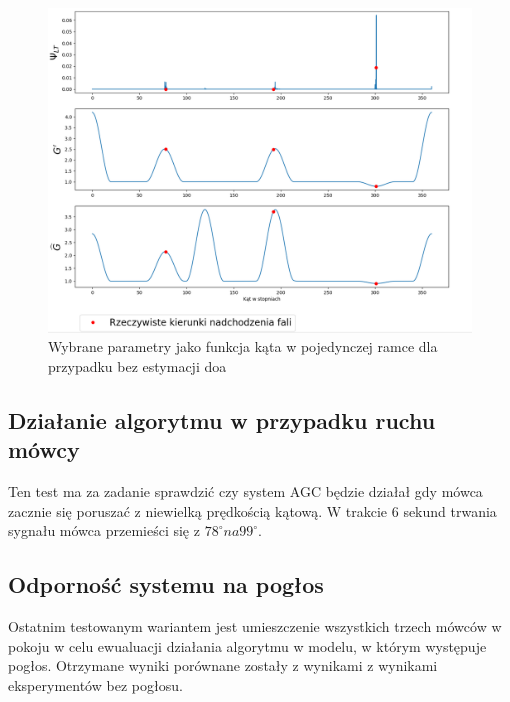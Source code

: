 \begin{figure}[h]
    \centering
    \includegraphics[width=\textwidth]{Images/multi_user_params_in_angle.png}
    \caption{Wybrane parametry jako funkcja kąta w pojedynczej ramce dla przypadku bez estymacji doa}
    \label{fig:multi_user_no_doa_params_in_angle}
\end{figure}

\subsection{Działanie algorytmu w przypadku ruchu mówcy}

Ten test ma za zadanie sprawdzić czy system AGC będzie działał gdy mówca zacznie się poruszać z niewielką prędkością kątową. W trakcie 6 sekund trwania sygnału mówca przemieści się z $78^{\circ} na 99^{\circ}$.


\subsection{Odporność systemu na pogłos}

Ostatnim testowanym wariantem jest umieszczenie wszystkich trzech mówców w pokoju w celu ewualuacji działania algorytmu w modelu, w którym występuje pogłos. Otrzymane wyniki porównane zostały z wynikami z wynikami eksperymentów bez pogłosu.













